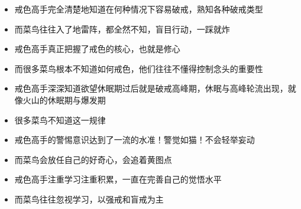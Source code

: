 \begin{paracol}{2}
    \begin{itemize}
        \item 戒色高手完全清楚地知道在何种情况下容易破戒，熟知各种破戒类型
    \end{itemize}
    \switchcolumn
    \begin{itemize}
        \item 而菜鸟往往入了地雷阵，都全然不知，盲目行动，一踩就炸
    \end{itemize}
    \switchcolumn*

    \begin{itemize}
        \item 戒色高手真正把握了戒色的核心，也就是修心
    \end{itemize}
    \switchcolumn
    \begin{itemize}
        \item 而很多菜鸟根本不知道如何戒色，他们往往不懂得控制念头的重要性
    \end{itemize}
    \switchcolumn*

    \begin{itemize}
        \item 戒色高手深深知道欲望休眠期过后就是破戒高峰期，休眠与高峰轮流出现，就像火山的休眠期与爆发期
    \end{itemize}
    \switchcolumn
    \begin{itemize}
        \item 很多菜鸟不知道这一规律
    \end{itemize}
    \switchcolumn*

    \begin{itemize}
        \item 戒色高手的警惕意识达到了一流的水准！警觉如猫！不会轻举妄动
    \end{itemize}
    \switchcolumn
    \begin{itemize}
        \item 而菜鸟会放任自己的好奇心，会追着黄图点
    \end{itemize}
    \switchcolumn*

    \begin{itemize}
        \item 戒色高手注重学习注重积累，一直在完善自己的觉悟水平
    \end{itemize}
    \switchcolumn
    \begin{itemize}
        \item 而菜鸟往往忽视学习，以强戒和盲戒为主
    \end{itemize}
    \switchcolumn*


\end{paracol}
